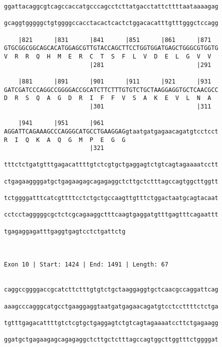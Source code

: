 \documentclass{article}
\begin{document}
\begin{Verbatim}
ggattacaggcgtcagccaccatgcccagcctcttatgacctattcttttaataaaagag
                                                            
gcaggtgggggctgtggggccacctacactcactctggacacatttgtttgggctccagg
                                                            
    |821      |831      |841      |851      |861      |871  
GTGCGGCGGCAGCACATGGAGCGTTGTACCAGCTTCCTGGTGGATGAGCTGGGCGTGGTG
V  R  R  Q  H  M  E  R  C  T  S  F  L  V  D  E  L  G  V  V  
                        |281                          |291  
  
    |881      |891      |901      |911      |921      |931  
GATCGATCCCAGGCCGGGGACCGCATCTTCTTTGTGTCTGCTAAGGAGGTGCTCAACGCC
D  R  S  Q  A  G  D  R  I  F  F  V  S  A  K  E  V  L  N  A  
                        |301                          |311  
  
    |941      |951      |961                                
AGGATTCAGAAAGCCCAGGGCATGCCTGAAGGAGgtaatgatgagaacagatgtcctcct
R  I  Q  K  A  Q  G  M  P  E  G  G                          
                        |321                                
  
tttctctgatgtttgagacattttgtctcgtgctgaggagtctgtcagtagaaaatcctt
                                                            
ctgagaaggggatgctgagaagagcagagaggctcttgctctttagccagtggcttggtt
                                                            
tctggggatttcatcgttttcctctgctgccaagttgtttctggactaatgcagtacaat
                                                            
cctcctagggggcgctctcgcagaaggctttcaagtgaggatgtttgagtttcagaattt
                                                            
tgagaggagatttgaggtgagtcctctgattctg
                                  
                                  
 
Exon 10 | Start: 1424 | End: 1491 | Length: 67


caggccggggaccgcatcttctttgtgtctgctaaggaggtgctcaacgccaggattcag
                                                            
aaagcccagggcatgcctgaaggaggtaatgatgagaacagatgtcctccttttctctga
                                                            
tgtttgagacattttgtctcgtgctgaggagtctgtcagtagaaaatccttctgagaagg
                                                            
ggatgctgagaagagcagagaggctcttgctctttagccagtggcttggtttctggggat
                                                            

\end{Verbatim}
\end{document}
